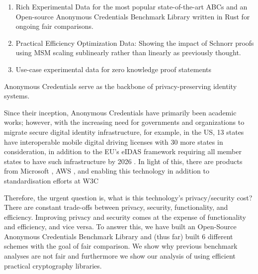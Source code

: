 \begin{enumerate}
    \item Rich Experimental Data for the most popular state-of-the-art ABCs and an Open-source Anonymous Credentials Benchmark Library written in Rust for ongoing fair comparisons. 

    \item Practical Efficiency Optimization Data: Showing the impact of Schnorr proofs using MSM scaling sublinearly rather than linearly as previously thought. 

    \item Use-case experimental data for zero knowledge proof statements
    
\end{enumerate}








































Anonymous Credentials serve as the backbone of privacy-preserving identity systems. 

Since their inception, Anonymous Credentials have primarily been academic works; however, with the increasing need for governments and organizations to migrate secure digital identity infrastructure, for example, in the US, 13 states have interoperable mobile digital driving licenses \cite{aamva_jurisdiction_nodate} with 30 more states in consideration, in addition to the EU's eIDAS framework requiring all member states to have such infrastructure by 2026 \cite{european_parliament_meps_2024}. In light of this, there are products from Microsoft \cite{microsoft_microsoft_2025}, AWS \cite{aws_verifiable_nodate}, and \cite{dock_labs_dock_nodate} enabling this technology in addition to standardisation efforts at W3C \cite{w3c_verifiable_2025, w3c_decentralized_2022}

Therefore, the urgent question is, what is this technology's privacy/security cost? There are constant trade-offs between privacy, security, functionality, and efficiency. Improving privacy and security comes at the expense of functionality and efficiency, and vice versa. To answer this, we have built an Open-Source Anonymous Credentials Benchmark Library and (thus far) built 6 different schemes with the goal of fair comparison. We show why previous benchmark analyses are not fair and furthermore we show our analysis of using efficient practical cryptography libraries.  


